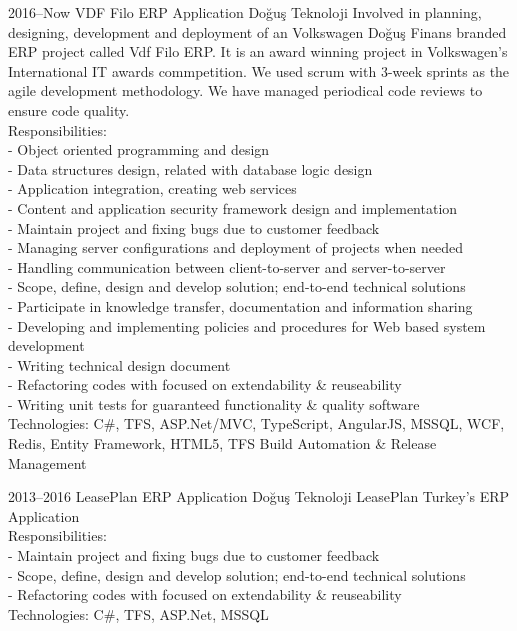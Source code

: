 \documentclass[]{../friggeri-cv} %
\begin{document}
\begin{entrylist}

\entry
{2016--Now}
{VDF Filo ERP Application}
{Doğuş Teknoloji}
{Involved in planning, designing, development and deployment of an Volkswagen Doğuş Finans branded ERP project called Vdf Filo ERP. It is an award winning project in Volkswagen's International IT awards commpetition. We used scrum with 3-week sprints as the agile development methodology. We have managed periodical code reviews to ensure code quality.	\\
	
Responsibilities:\\
- Object oriented programming and design\\
- Data structures design, related with database logic design\\
- Application integration, creating web services\\
- Content and application security framework design and implementation\\
- Maintain project and fixing bugs due to customer feedback\\
- Managing server configurations and deployment of projects when needed\\
- Handling communication between client-to-server and server-to-server\\
- Scope, define, design and develop solution; end-to-end technical solutions\\
- Participate in knowledge transfer, documentation and information sharing\\
- Developing and implementing policies and procedures for Web based system development\\
- Writing technical design document\\
- Refactoring codes with focused on extendability \& reuseability\\
- Writing unit tests for guaranteed functionality \& quality software\\

Technologies: 
C\#, TFS, ASP.Net/MVC, TypeScript, AngularJS, MSSQL, WCF, Redis, Entity Framework, HTML5, TFS Build Automation \& Release Management
}

\pagebreak

\entry
{2013--2016}
{LeasePlan ERP Application}
{Doğuş Teknoloji}
{LeasePlan Turkey's ERP Application\\

Responsibilities:\\
- Maintain project and fixing bugs due to customer feedback\\
- Scope, define, design and develop solution; end-to-end technical solutions\\
- Refactoring codes with focused on extendability \& reuseability\\

Technologies: 
C\#, TFS, ASP.Net, MSSQL
}

\end{entrylist}
\end{document}
